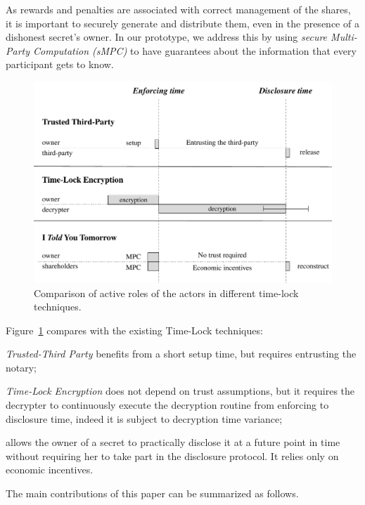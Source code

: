As rewards and penalties are associated with correct management of the shares, it is important to securely generate and distribute them, even in the presence of a dishonest secret's owner.
In our prototype, we address this by using {\em secure Multi-Party Computation (sMPC)} to have guarantees about the information that every participant gets to know.

\begin{figure}[t]
	\centering
	\includegraphics[width=\textwidth]{fig/models}
	\caption{Comparison of active roles of the actors in different time-lock techniques.}
	\label{fig:models}
\end{figure}

Figure~\ref{fig:models} compares \shortname with the existing Time-Lock techniques:

\begin{compactitem}
	\item {\em Trusted-Third Party} benefits from a short setup time, but requires entrusting the notary;
	
	\item {\em Time-Lock Encryption} does not depend on trust assumptions, but it requires the decrypter to continuously execute the decryption routine from enforcing to disclosure time, indeed it is subject to decryption time variance;
	
	\item {\em \name} allows the owner of a secret to practically disclose it at a future point in time without requiring her to take part in the disclosure protocol. It relies only on economic incentives.
\end{compactitem}


The main contributions of this paper can be summarized as follows.

